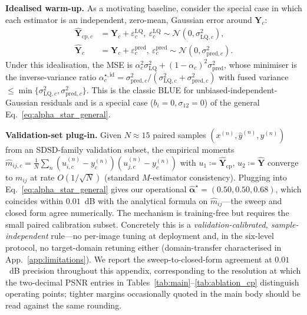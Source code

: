 \noindent\textbf{Idealised warm-up.} As a motivating baseline, consider the special case in which each estimator is an independent, zero-mean, Gaussian error around $\mathbf{Y}_c$:
\begin{align}
\hat{\mathbf{Y}}_{\text{cp},c} &= \mathbf{Y}_{c} + \varepsilon^{\text{LQ}}_{c},\ \varepsilon^{\text{LQ}}_{c}\!\sim\!\mathcal{N}(0,\sigma^{2}_{\text{LQ},c}), \nonumber \\
\hat{\mathbf{Y}}_{c} &= \mathbf{Y}_{c} + \varepsilon^{\text{pred}}_{c},\ \varepsilon^{\text{pred}}_{c}\!\sim\!\mathcal{N}(0,\sigma^{2}_{\text{pred},c}). \nonumber
\end{align}
Under this idealisation, the MSE is $\alpha_c^2\sigma^2_{\text{LQ}}+(1{-}\alpha_c)^2\sigma^2_{\text{pred}}$, whose minimiser is the inverse-variance ratio $\alpha_c^{\star,\text{id}}\!=\!\sigma^2_{\text{pred},c}/(\sigma^2_{\text{LQ},c}+\sigma^2_{\text{pred},c})$ with fused variance $\le\min\{\sigma^2_{\text{LQ},c},\sigma^2_{\text{pred},c}\}$. This is the classic BLUE for unbiased-independent-Gaussian residuals and is a special case ($b_i{=}0,\sigma_{12}{=}0$) of the general Eq.~\eqref{eq:alpha_star_general}.

\noindent\textbf{Validation-set plug-in.} Given $N{\approx}15$ paired samples $(x^{(n)},\hat{y}^{(n)},y^{(n)})$ from an SDSD-family validation subset, the empirical moments $\widehat{m}_{ij,c}=\tfrac{1}{N}\sum_n(u^{(n)}_{i,c}{-}y^{(n)}_c)(u^{(n)}_{j,c}{-}y^{(n)}_c)$ with $u_1\!\coloneqq\!\hat{\mathbf{Y}}_{\text{cp}}$, $u_2\!\coloneqq\!\hat{\mathbf{Y}}$ converge to $m_{ij}$ at rate $O(1/\sqrt{N})$ (standard $M$-estimator consistency). Plugging into Eq.~\eqref{eq:alpha_star_general} gives our operational $\widehat{\boldsymbol{\alpha}}^{\star}=(0.50,0.50,0.68)$, which coincides within $0.01$~dB with the analytical formula on $\widehat{m}_{ij}$---the sweep and closed form agree numerically. The mechanism is training-free but requires the small paired calibration subset. Concretely this is a \emph{validation-calibrated, sample-independent} rule---no per-image tuning at deployment and, in the six-level protocol, no target-domain retuning either (domain-transfer characterised in App.~\ref{app:limitations}). We report the sweep-to-closed-form agreement at $0.01$~dB precision throughout this appendix, corresponding to the resolution at which the two-decimal PSNR entries in Tables~\ref{tab:main}--\ref{tab:ablation_cp} distinguish operating points; tighter margins occasionally quoted in the main body should be read against the same rounding.


